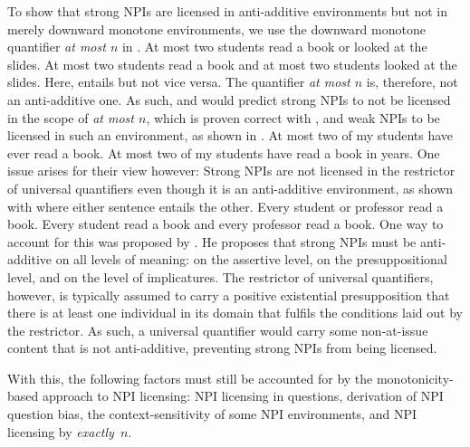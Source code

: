 To show that strong NPIs are licensed in anti-additive environments but not in merely downward monotone environments, we use the downward monotone quantifier \textit{at most $n$} in .
\pex\label{ex:aa-atmost}%
\a At most two students read a book or looked at the slides.
\a At most two students read a book and at most two students looked at the slides.
\xe
Here,  entails  but not vice versa. The quantifier \textit{at most $n$} is, therefore, not an anti-additive one. As such, \textcite{Zwarts1998} and \textcite{Wouden1997} would predict strong NPIs to not be licensed in the scope of \textit{at most $n$}, which is proven correct with , and weak NPIs to be licensed in such an environment, as shown in .
\pex\label{ex:npi-atmost}%
\a At most two of my students have ever read a book.
\a \ljudge{\#}At most two of my students have read a book in years.
\xe
One issue arises for their view however: Strong NPIs are not licensed in the restrictor of universal quantifiers even though it is an anti-additive environment, as shown with  where either sentence entails the other.
\pex\label{ex:aa-every}%
\a Every student or professor read a book.
\a Every student read a book and every professor read a book.
\xe
One way to account for this was proposed by \textcite{Gajewski2011}. He proposes that strong NPIs must be anti-additive on all levels of meaning: on the assertive level, on the presuppositional level, and on the level of implicatures. The restrictor of universal quantifiers, however, is typically assumed to carry a positive existential presupposition that there is at least one individual in its domain that fulfils the conditions laid out by the restrictor. As such, a universal quantifier would carry some non-at-issue content that is not anti-additive, preventing strong NPIs from being licensed.

With this, the following factors must still be accounted for by the monotonicity-based approach to NPI licensing: NPI licensing in questions, derivation of NPI question bias, the context-sensitivity of some NPI environments, and NPI licensing by \textit{exactly~$n$}.

